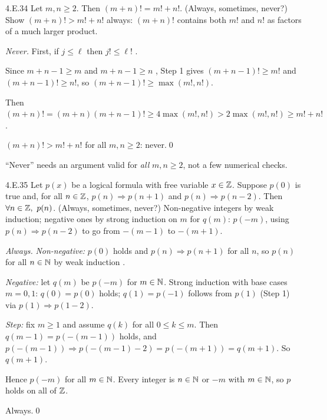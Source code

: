\begin{bookex}[recommended]{4.E.34}
Let $m,n\ge2$. Then $(m+n)!=m!+n!$. (Always, sometimes, never?)
\solution
\plan Show $(m+n)!>m!+n!$ always: $(m+n)!$ contains both $m!$ and $n!$ as factors of a much larger product.
\begin{steps}
\item \emph{Never.} First, if $j\le\ell$ then $j!\le\ell!$ .
\item Since $m+n-1\ge m$ and $m+n-1\ge n$ , Step 1 gives $(m+n-1)!\ge m!$ and $(m+n-1)!\ge n!$, so $(m+n-1)!\ge\max(m!,n!)$.
\item Then $(m+n)!=(m+n)(m+n-1)!\ge4\max(m!,n!)>2\max(m!,n!)\ge m!+n!$ .
\end{steps}
\conclusion $(m+n)!>m!+n!$ for all $m,n\ge2$: never.\qed
\begin{compare}
\item ``Never'' needs an argument valid for \emph{all} $m,n\ge2$, not a few numerical checks.
\end{compare}
\end{bookex}

\begin{bookex}[recommended]{4.E.35}
Let $p(x)$ be a logical formula with free variable $x\in\mathbb{Z}$. Suppose $p(0)$ is true and, for all $n\in\mathbb{Z}$, $p(n)\Rightarrow p(n+1)$ and $p(n)\Rightarrow p(n-2)$. Then $\forall n\in\mathbb{Z},\ p(n)$. (Always, sometimes, never?)
\solution
\plan Non-negative integers by weak induction; negative ones by strong induction on $m$ for $q(m)$: $p(-m)$, using $p(n)\Rightarrow p(n-2)$ to go from $-(m-1)$ to $-(m+1)$.
\begin{steps}
\item \emph{Always.} \emph{Non-negative:} $p(0)$ holds and $p(n)\Rightarrow p(n+1)$ for all $n$, so $p(n)$ for all $n\in\mathbb{N}$ by weak induction .
\item \emph{Negative:} let $q(m)$ be $p(-m)$ for $m\in\mathbb{N}$. Strong induction with base cases $m=0,1$: $q(0)=p(0)$ holds; $q(1)=p(-1)$ follows from $p(1)$ (Step 1) via $p(1)\Rightarrow p(1-2)$.
\item \emph{Step:} fix $m\ge1$ and assume $q(k)$ for all $0\le k\le m$. Then $q(m-1)=p(-(m-1))$ holds, and $p(-(m-1))\Rightarrow p(-(m-1)-2)=p(-(m+1))=q(m+1)$. So $q(m+1)$.
\item Hence $p(-m)$ for all $m\in\mathbb{N}$. Every integer is $n\in\mathbb{N}$ or $-m$ with $m\in\mathbb{N}$, so $p$ holds on all of $\mathbb{Z}$.
\end{steps}
\conclusion Always.\qed
\end{bookex}
